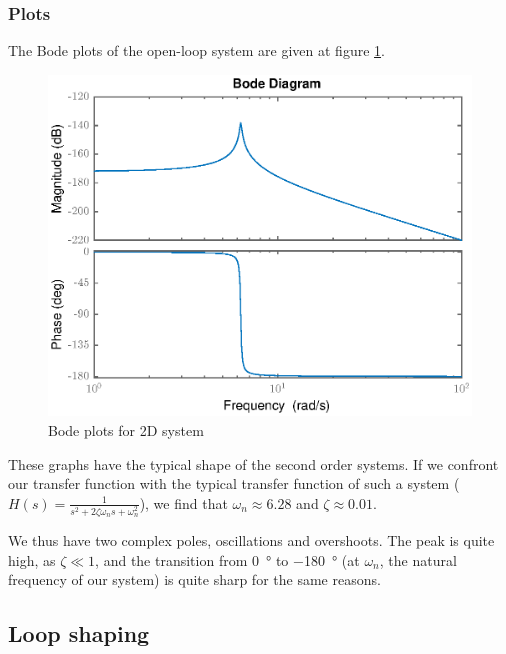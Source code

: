 \subsubsection{Plots}
The Bode plots of the open-loop system are given at figure \ref{fig:bode-ol}.
\begin{figure}[H]
    \centering
    \includegraphics[scale=0.8]{resources/eps/4-Val/bode-ol.eps}
    \caption{Bode plots for 2D system}
    \label{fig:bode-ol}
\end{figure}
These graphs have the typical shape of the second order systems. If we confront our transfer function with the typical transfer function of such a system ($H(s)=\frac{1}{s^{2}+2 \zeta \omega_{n} s+\omega_{n}^{2}}$), we find that $\omega_n\approx6.28$ and $\zeta \approx 0.01$.\par
We thus have two complex poles, oscillations and overshoots. The peak is quite high, as $\zeta \ll 1$, and the transition from \SI{0}{\degree} to \SI{-180}{\degree} (at $\omega_n$, the natural frequency of our system) is quite sharp for the same reasons.

\subsection{Loop shaping}
